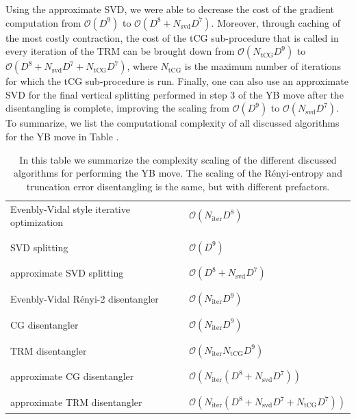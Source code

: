 Using the approximate SVD, we were able to decrease the cost of the gradient computation from $\mathcal{O}(D^9)$ to $\mathcal{O}(D^8 + N_\text{svd}D^7)$. Moreover, through caching of the most costly contraction, the cost of the tCG sub-procedure that is called in every iteration of the TRM can be brought down from $\mathcal{O}(N_\text{tCG}D^9)$ to $\mathcal{O}(D^8+N_\text{svd}D^7 + N_\text{tCG} D^7)$, where $N_\text{tCG}$ is the maximum number of iterations for which the tCG sub-procedure is run. Finally, one can also use an approximate SVD for the final vertical splitting performed in step 3 of the YB move after the disentangling is complete, improving the scaling from $\mathcal{O}(D^9)$ to $\mathcal{O}(N_\text{svd}D^7)$. To summarize, we list the computational complexity of all discussed algorithms for the YB move in Table .
\begin{table}
	\begin{tabular}{ l | l }
		Evenbly-Vidal style iterative optimization & $\mathcal{O}(N_\text{iter}D^8)$ \\ \\[-1em]
		\hline \\[-1em]
		SVD splitting & $\mathcal{O}(D^9)$ \\ \\[-1em]
		\hline \\[-1em]
		approximate SVD splitting & $\mathcal{O}(D^8 + N_\text{svd}D^7)$ \\ \\[-1em]
		\hline
		\hline \\[-1em]
		Evenbly-Vidal Rényi-2 disentangler  & $\mathcal{O}(N_\text{iter}D^9)$ \\ \\[-1em]
		\hline \\[-1em]
		CG disentangler & $\mathcal{O}(N_\text{iter}D^9)$ \\ \\[-1em]
		\hline \\[-1em]
		TRM disentangler & $\mathcal{O}(N_\text{iter}N_\text{tCG}D^9)$ \\ \\[-1em]
		\hline \\[-1em]
		approximate CG disentangler & $\mathcal{O}(N_\text{iter}(D^8 + N_\text{svd}D^7))$ \\ \\[-1em]
		\hline \\[-1em]
		approximate TRM disentangler & $\mathcal{O}(N_\text{iter}(D^8 + N_\text{svd}D^7 + N_\text{tCG}D^7))$ \\
	\end{tabular}
	\caption{In this table we summarize the complexity scaling of the different discussed algorithms for performing the YB move. The scaling of the Rényi-entropy and truncation error disentangling is the same, but with different prefactors.}
	\label{table:computational_complexity_YB_move}
\end{table}
